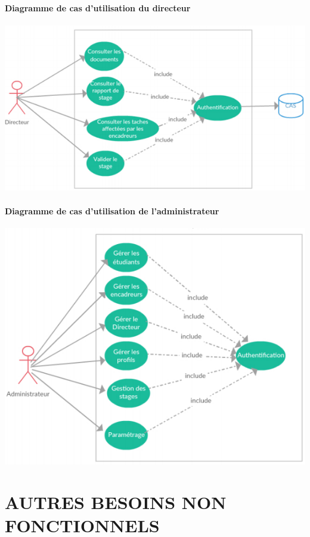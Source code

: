\documentclass{scrreprt}
\begin{document}
\subsubsection{Diagramme de cas d'utilisation du directeur}
\begin{center}
	\includegraphics[scale=0.55]{image/casutilisationdudirecteur.png}
\end{center}
\subsubsection{Diagramme de cas d'utilisation de l'administrateur}
\begin{center}
	\includegraphics[scale=0.55]{image/casutilisationdeadministrateur.png}
\end{center}


\chapter{AUTRES BESOINS NON FONCTIONNELS}
\end{document}
